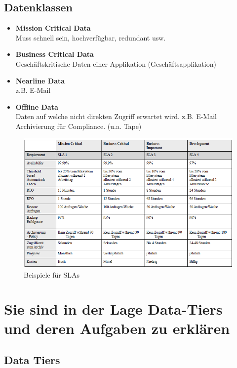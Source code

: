 \subsection{Datenklassen}\label{sec:datenklassen}

\begin{itemize}
	\item \textbf{Mission Critical Data} \\
	Muss schnell sein, hochverfügbar, redundant usw.
	\item \textbf{Business Critical Data} \\
	Geschäftskritische Daten einer Applikation (Geschäftsapplikation)
	\item \textbf{Nearline Data} \\
	z.B. E-Mail
	\item \textbf{Offline Data} \\
	Daten auf welche nicht direkten Zugriff erwartet wird. z.B. E-Mail Archivierung für Compliance. (u.a. Tape)
\end{itemize}

\begin{figure}[h!]
	\centering
	\includegraphics[width=0.9\linewidth]{fig/sla}
	\caption{Beispiele für SLAs}
	\label{fig:sla_beispiele}
\end{figure}

\section{Sie sind in der Lage Data-Tiers und deren Aufgaben zu erklären}

\subsection{Data Tiers}\label{sec:storagetier}

